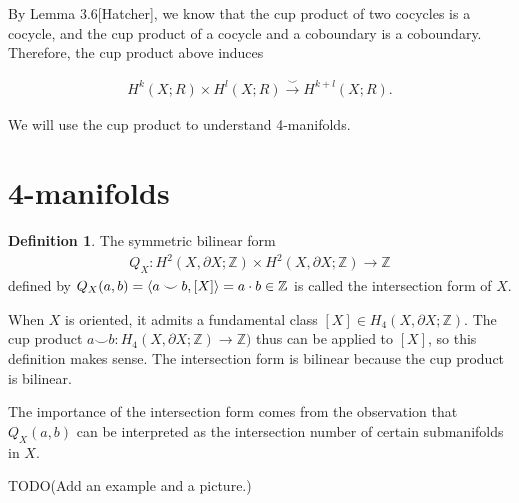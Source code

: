 \documentclass[11pt, psamsfonts]{amsart}
\theoremstyle{definition}
\newtheorem{defn}[thm]{Definition}
\theoremstyle{remark}
\numberwithin{equation}{section}
\begin{document}
By Lemma 3.6[Hatcher], we know that the cup product of two cocycles is a cocycle, and the cup product of a cocycle and a coboundary is a coboundary.
Therefore, the cup product above induces

\begin{align*}
  H^k(X; R) \times H^l(X; R) \xrightarrow{\smile} H^{k + l}(X; R).
\end{align*}

We will use the cup product to understand 4-manifolds.

\section{4-manifolds}

\begin{defn}
  The symmetric bilinear form
  \begin{align*}
    Q_X:H^2(X, \partial X; \mathbb{Z}) \times H^2(X, \partial X; \mathbb{Z}) \rightarrow \mathbb{Z}
  \end{align*}
  defined by $Q_X(a, b) = \ev{a \smile b, [X]} = a \cdot b \in \mathbb{Z}$ is called the intersection form of $X$.
\end{defn}

When $X$ is oriented, it admits a fundamental class $[X] \in H_4(X, \partial X; \mathbb{Z})$.
The cup product $a \smile b: H_4(X, \partial X; \mathbb{Z}) \rightarrow \mathbb{Z})$ thus can be applied to $[X]$, so this definition makes sense.
The intersection form is bilinear because the cup product is bilinear.

The importance of the intersection form comes from the observation that $Q_X(a, b)$ can be interpreted as the intersection number of certain submanifolds in $X$.

TODO(Add an example and a picture.)
\end{document}
